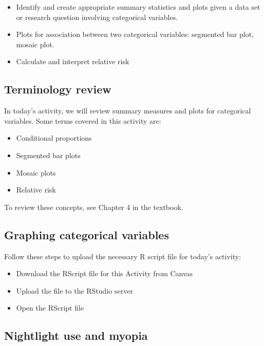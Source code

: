 \documentclass[
]{report}
\begin{document}
\begin{itemize}
\item
  Identify and create appropriate summary statistics and plots given a data set or research question involving categorical variables.
\item
  Plots for association between two categorical variables:
  segmented bar plot, mosaic plot.
\item
  Calculate and interpret relative risk
\end{itemize}

\subsection{Terminology review}\label{terminology-review-13}

In today's activity, we will review summary measures and plots for categorical variables. Some terms covered in this activity are:

\begin{itemize}
\item
  Conditional proportions
\item
  Segmented bar plots
\item
  Mosaic plots
\item
  Relative risk
\end{itemize}

To review these concepts, see Chapter 4 in the textbook.

\subsection{Graphing categorical variables}\label{graphing-categorical-variables}

Follow these steps to upload the necessary R script file for today's activity:

\begin{itemize}
\item
  Download the RScript file for this Activity from Canvas
\item
  Upload the file to the RStudio server
\item
  Open the RScript file
\end{itemize}

\subsection*{Nightlight use and myopia}\label{nightlight-use-and-myopia}
\end{document}
